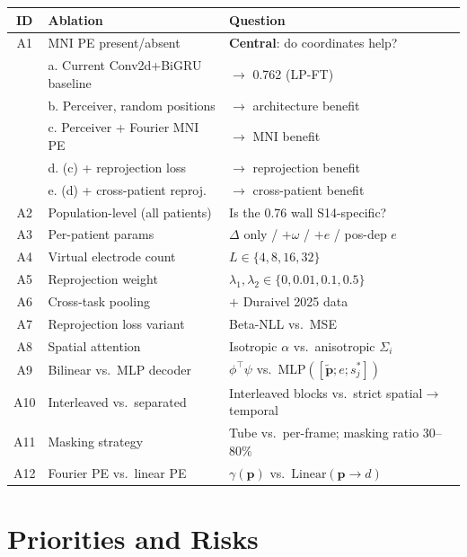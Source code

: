 \documentclass[11pt,letterpaper]{article}
\newcommand{\bfp}{\mathbf{p}}
\begin{document}
\begin{table}[ht!]\centering\small
\begin{tabular}{@{}clp{6.8cm}@{}}
\toprule
\textbf{ID} & \textbf{Ablation} & \textbf{Question} \\
\midrule
A1 & MNI PE present/absent & \textbf{Central}: do coordinates help? \\
 & \quad a. Current Conv2d+BiGRU baseline & $\to$ 0.762 (LP-FT) \\
 & \quad b. Perceiver, random positions & $\to$ architecture benefit \\
 & \quad c. Perceiver + Fourier MNI PE & $\to$ MNI benefit \\
 & \quad d. (c) + reprojection loss & $\to$ reprojection benefit \\
 & \quad e. (d) + cross-patient reproj.\ & $\to$ cross-patient benefit \\
\midrule
A2 & Population-level (all patients) & Is the 0.76 wall S14-specific? \\
A3 & Per-patient params & $\Delta$ only / $+\omega$ / $+e$ / pos-dep $e$ \\
A4 & Virtual electrode count & $L \in \{4, 8, 16, 32\}$ \\
A5 & Reprojection weight & $\lambda_1, \lambda_2 \in \{0, 0.01, 0.1, 0.5\}$ \\
A6 & Cross-task pooling & $+$ Duraivel 2025 data \\
A7 & Reprojection loss variant & Beta-NLL vs.\ MSE \\
A8 & Spatial attention & Isotropic $\alpha$ vs.\ anisotropic $\Sigma_i$ \\
A9 & Bilinear vs.\ MLP decoder & $\phi^\top\psi$ vs.\ MLP$([\tilde{\bfp}; e; s_j^*])$ \\
A10 & Interleaved vs.\ separated & Interleaved blocks vs.\ strict spatial$\to$temporal \\
A11 & Masking strategy & Tube vs.\ per-frame; masking ratio 30--80\% \\
A12 & Fourier PE vs.\ linear PE & $\gamma(\bfp)$ vs.\ $\text{Linear}(\bfp \to d)$ \\
\bottomrule
\end{tabular}
\end{table}



\section{Priorities and Risks}\label{sec:priorities}
\end{document}
